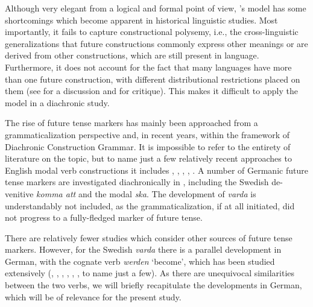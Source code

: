 \documentclass[output=paper,colorlinks,citecolor=brown]{langscibook}
\begin{document}
Although very elegant from a logical and formal point of view, \citeauthor{Reichenbach1947}’s model has some shortcomings which become apparent in historical linguistic studies. Most importantly, it fails to capture constructional polysemy, i.e., the cross-linguistic generalizations that future constructions commonly express other meanings or are derived from other constructions, which are still present in language. Furthermore, it does not account for the fact that many languages have more than one future construction, with different distributional restrictions placed on them (see \cite[17--18]{Hilpert2008} for a discussion and \cite{Comrie1981} for critique). This makes it difficult to apply the model in a diachronic study. 

The rise of future tense markers has mainly been approached from a grammaticalization perspective and, in recent years, within the framework of Diachronic Construction Grammar. It is impossible to refer to the entirety of literature on the topic, but to name just a few relatively recent approaches to English modal verb constructions it includes \citet[]{Traugott1989}, \citet[]{Gotti2003}, \citet[]{Aijmer1985}, \citet[]{Visser1963}, \citet[]{Ziegeler2006}. A number of Germanic future tense markers are investigated diachronically in \citet[]{Hilpert2008}, including the Swedish de-venitive \textit{komma att} and the modal \textit{ska}. The development of \textit{varda} is understandably not included, as the grammaticalization, if at all initiated, did not progress to a fully-fledged marker of future tense. 

There are relatively fewer studies which consider other sources of future tense markers. However, for the Swedish \textit{varda} there is a parallel development in German, with the cognate verb \textit{werden} ‘become’, which has been studied extensively (\cite{Diewald1997}, \cite{Kotin2003}, \cite{Hilpert2008}, \cite{Hartmann2021}, \cite{Kraemer2005}, \cite{Thieroff1992}, \cite{Vater1997} to name just a few). As there are unequivocal similarities between the two verbs, we will briefly recapitulate the developments in German, which will be of relevance for the present study.
\end{document}
